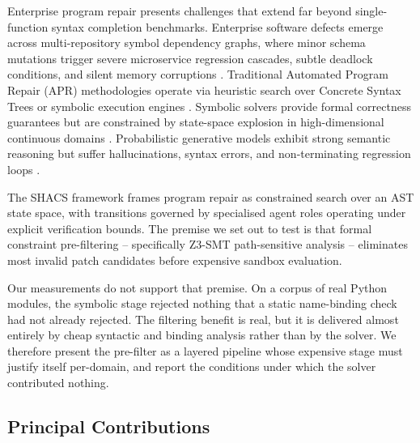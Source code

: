 \documentclass[10pt,twocolumn,letterpaper]{article}
\begin{document}
Enterprise program repair presents challenges that extend far beyond single-function syntax completion benchmarks. Enterprise software defects emerge across multi-repository symbol dependency graphs, where minor schema mutations trigger severe microservice regression cascades, subtle deadlock conditions, and silent memory corruptions \cite{arxiv_2405_01543,arxiv_2203_02155}. Traditional Automated Program Repair (APR) methodologies operate via heuristic search over Concrete Syntax Trees or symbolic execution engines \cite{arxiv_2010_11146}. Symbolic solvers provide formal correctness guarantees but are constrained by state-space explosion in high-dimensional continuous domains \cite{arxiv_2404_01131}. Probabilistic generative models exhibit strong semantic reasoning but suffer hallucinations, syntax errors, and non-terminating regression loops \cite{arxiv_2005_14165}.

The SHACS framework frames program repair as constrained search over an AST state space, with transitions governed by specialised agent roles operating under explicit verification bounds. The premise we set out to test is that formal constraint pre-filtering -- specifically Z3-SMT path-sensitive analysis -- eliminates most invalid patch candidates before expensive sandbox evaluation.

Our measurements do not support that premise. On a corpus of real Python modules, the symbolic stage rejected nothing that a static name-binding check had not already rejected. The filtering benefit is real, but it is delivered almost entirely by cheap syntactic and binding analysis rather than by the solver. We therefore present the pre-filter as a layered pipeline whose expensive stage must justify itself per-domain, and report the conditions under which the solver contributed nothing.


\subsection{Principal Contributions}
\end{document}
